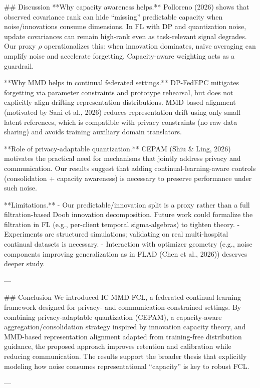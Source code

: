 ## Discussion  
**Why capacity awareness helps.** Polloreno (2026) shows that observed covariance rank can hide “missing” predictable capacity when noise/innovations consume dimensions. In FL with DP and quantization noise, update covariances can remain high-rank even as task-relevant signal degrades. Our proxy \(\rho\) operationalizes this: when innovation dominates, naive averaging can amplify noise and accelerate forgetting. Capacity-aware weighting acts as a guardrail.

**Why MMD helps in continual federated settings.** DP-FedEPC mitigates forgetting via parameter constraints and prototype rehearsal, but does not explicitly align drifting representation distributions. MMD-based alignment (motivated by Sani et al., 2026) reduces representation drift using only small latent references, which is compatible with privacy constraints (no raw data sharing) and avoids training auxiliary domain translators.

**Role of privacy-adaptable quantization.** CEPAM (Shiu & Ling, 2026) motivates the practical need for mechanisms that jointly address privacy and communication. Our results suggest that adding continual-learning-aware controls (consolidation + capacity awareness) is necessary to preserve performance under such noise.

**Limitations.**  
- Our predictable/innovation split is a proxy rather than a full filtration-based Doob innovation decomposition. Future work could formalize the filtration in FL (e.g., per-client temporal sigma-algebras) to tighten theory.  
- Experiments are structured simulations; validating on real multi-hospital continual datasets is necessary.  
- Interaction with optimizer geometry (e.g., noise components improving generalization as in FLAD (Chen et al., 2026)) deserves deeper study.

---

## Conclusion  
We introduced IC-MMD-FCL, a federated continual learning framework designed for privacy- and communication-constrained settings. By combining privacy-adaptable quantization (CEPAM), a capacity-aware aggregation/consolidation strategy inspired by innovation capacity theory, and MMD-based representation alignment adapted from training-free distribution guidance, the proposed approach improves retention and calibration while reducing communication. The results support the broader thesis that explicitly modeling how noise consumes representational “capacity” is key to robust FCL.

---

